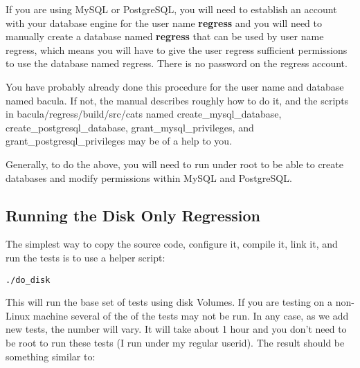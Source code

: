 If you are using MySQL or PostgreSQL, you will need to establish an
account with your database engine for the user name {\bf regress} and
you will need to manually create a database named {\bf regress} that can be
used by user name regress, which means you will have to give the user
regress sufficient permissions to use the database named regress.
There is no password on the regress account.

You have probably already done this procedure for the user name and
database named bacula.  If not, the manual describes roughly how to
do it, and the scripts in bacula/regress/build/src/cats named
create\_mysql\_database, create\_postgresql\_database, grant\_mysql\_privileges,
and grant\_postgresql\_privileges may be of a help to you.

Generally, to do the above, you will need to run under root to 
be able to create databases and modify permissions within MySQL and
PostgreSQL.


\subsection{Running the Disk Only Regression}

The simplest way to copy the source code, configure it, compile it, link
it, and run the tests is to use a helper script:

\footnotesize
\begin{verbatim}
./do_disk
\end{verbatim}
\normalsize




This will run the base set of tests using disk Volumes.
If you are testing on a
non-Linux machine several of the of the tests may not be run.  In any case,
as we add new tests, the number will vary.  It will take about 1 hour
and you don't need to be root
to run these tests (I run under my regular userid).  The result should be
something similar to:

